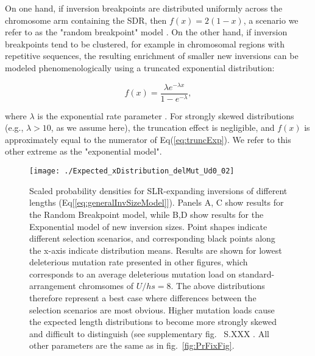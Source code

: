 \documentclass{article}[12pt]
\newcommand\hl[1]{%
  \bgroup
  \hskip0pt\color{blue!80!black}%
  #1%
  \egroup
}
\begin{document}
On one hand, if inversion breakpoints are distributed uniformly across the chromosome arm containing the SDR, then $f(x) = 2(1 - x)$, a scenario we refer to as the "random breakpoint" model \citep{vanValenLevins1968}. On the other hand, if inversion breakpoints tend to be clustered, for example in chromosomal regions with repetitive sequences, the resulting enrichment of smaller new inversions can be modeled phenomenologically using a truncated exponential distribution:
\begin{linenomath*}
\begin{equation} \label{eq:truncExp}
  f(x) = \frac{ \lambda e^{-\lambda x}} {1 - e^{-\lambda}},
\end{equation}
\end{linenomath*}

\noindent where $\lambda$ is the exponential rate parameter \citep{PevznerTesler2003, PengPevznerTesler2006, ChengKirkpatrick2019,ConnallonOlito2021}. For strongly skewed distributions (e.g., $\lambda > 10$, as we assume here), the truncation effect is negligible, and $f(x)$ is approximately equal to the numerator of Eq(\ref{eq:truncExp}). We refer to this other extreme as the "exponential model". 

 \begin{figure}[htbp]
 \centering
 \texttt{[image: ./Expected\_xDistribution\_delMut\_Ud0\_02]}
 \caption{Scaled probability densities for SLR-expanding inversions of different lengths (Eq[\ref{eq:generalInvSizeModel}]). Panels A, C show results for the Random Breakpoint model, while B,D show results for the Exponential model of new inversion sizes. Point shapes indicate different selection scenarios, and corresponding black points along the x-axis indicate distribution means. Results are shown for lowest deleterious mutation rate presented in other figures, which corresponds to an average deleterious mutation load on standard-arrangement chromsomes of $U/hs = 8$. The above distributions therefore represent a best case where differences between the selection scenarios are most obvious. Higher mutation loads cause the expected length distributions to become more strongly skewed and difficult to distinguish (see supplementary fig.~\hl{S.XXX}. All other parameters are the same as in fig.~\ref{fig:PrFixFig}.}
 \label{fig:ExpectedDistFig}
 \end{figure}
\end{document}
